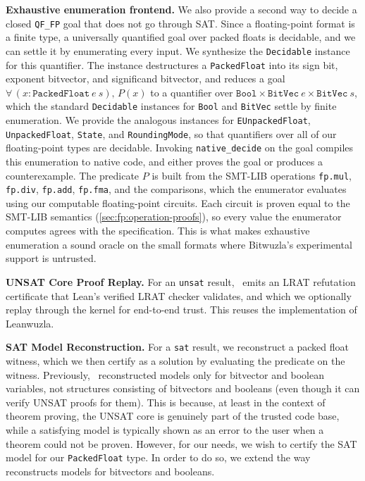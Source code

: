 \noindent\textbf{Exhaustive enumeration frontend.}
We also provide a second way to decide a closed \texttt{QF\_FP} goal that does not go through SAT.
Since a floating-point format is a finite type, a universally quantified goal over packed floats is decidable, and we can settle it by enumerating every input.
We synthesize the \texttt{Decidable} instance for this quantifier.
The instance destructures a \texttt{PackedFloat} into its sign bit, exponent bitvector, and significand bitvector, and reduces a goal $\forall\,(x : \texttt{PackedFloat}~e~s),\, P(x)$ to a quantifier over $\texttt{Bool} \times \texttt{BitVec}~e \times \texttt{BitVec}~s$, which the standard \texttt{Decidable} instances for \texttt{Bool} and \texttt{BitVec} settle by finite enumeration.
We provide the analogous instances for \texttt{EUnpackedFloat}, \texttt{UnpackedFloat}, \texttt{State}, and \texttt{RoundingMode}, so that quantifiers over all of our floating-point types are decidable.
Invoking \texttt{native\_decide} on the goal compiles this enumeration to native code, and either proves the goal or produces a counterexample.
The predicate $P$ is built from the SMT-LIB operations \texttt{fp.mul}, \texttt{fp.div}, \texttt{fp.add}, \texttt{fp.fma}, and the comparisons, which the enumerator evaluates using our computable floating-point circuits.
Each circuit is proven equal to the SMT-LIB semantics (\cref{sec:fp:operation-proofs}), so every value the enumerator computes agrees with the specification.
This is what makes exhaustive enumeration a sound oracle on the small formats where Bitwuzla's experimental support is untrusted.

\noindent\textbf{UNSAT Core Proof Replay.}
For an \texttt{unsat} result, \bvdecide{}~emits an LRAT refutation certificate that Lean's
verified LRAT checker validates, and which we optionally replay through the kernel for end-to-end trust.
This reuses the implementation of Leanwuzla.

\noindent\textbf{SAT Model Reconstruction.}
For a \texttt{sat} result, we reconstruct a packed float witness,
which we then certify as a solution by evaluating the predicate on the witness.
Previously, \bvdecide{}~reconstructed models only for bitvector and boolean variables, not structures consisting
of bitvectors and booleans (even though it can verify UNSAT proofs for them).
This is because, at least in the context of theorem proving, the UNSAT core is genuinely part
of the trusted code base, while a satisfying model is typically shown as an error to the user when a theorem could not be proven.
However, for our needs, we wish to certify the SAT model for our \texttt{PackedFloat} type.
In order to do so, we extend the way \bvdecide{} reconstructs models for bitvectors and booleans.



